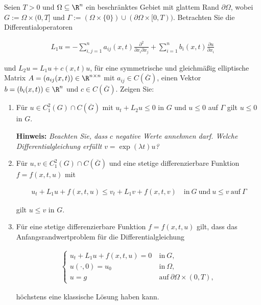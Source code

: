 
\begin{exercise}

\phantom{}

Seien $T > 0$ und $\Omega \subseteq \R^n$ ein beschränktes Gebiet mit glattem Rand $\partial \Omega$, wobei $G := \Omega \times (0, T]$ und $\Gamma := (\Omega \times \{0\}) \cup (\partial \Omega \times [0, T))$.
Betrachten Sie die Differentialoperatoren

\begin{align*}
  L_1 u
  =
  -\sum_{i, j=1}^n
  a_{ij}(x, t)
  \frac{\partial^2}{\partial x_i \partial x_j}
  +
  \sum_{i=1}^n
  b_i(x, t)
  \frac{\partial u}{\partial x_i}
\end{align*}

und $L_2 u = L_1 u + c(x, t) u$, für eine symmetrische und gleichmäßig elliptische Matrix $A = (a_{ij}(x, t)) \in \R^{n \times n}$ mit $a_{ij} \in C(\overline{G})$, einen Vektor $b = (b_i(x, t)) \in \R^n$ und $c \in C(\overline{G})$.
Zeigen Sie:

\begin{enumerate}[label = (\roman*)]

  \item Für $u \in C_1^2(G) \cap C(\overline{G})$ mit $u_t + L_2u \leq 0$ in $G$ und $u \leq 0$ auf $\Gamma$ gilt $u \leq 0$ in $G$.

  \textbf{Hinweis:}
  \textit
  {
    Beachten Sie, dass $c$ negative Werte annehmen darf.
    Welche Differentialgleichung erfüllt $v = \exp(\lambda t) u$?
  }

  \item Für $u, v \in C_1^2(G) \cap C(\overline{G})$ und eine stetige differenzierbare Funktion $f = f(x, t, u)$ mit

  \begin{align*}
    u_t + L_1 u + f(x, t, u)
    \leq
    v_t + L_1 v + f(x, t, v)
    \quad
    \text{in}~ G ~\text{und}~ u \leq v ~\text{auf}~ \Gamma
  \end{align*}

  gilt $u \leq v$ in $G$.

  \item Für eine stetige differenzierbare Funktion $f = f(x, t, u)$ gilt, dass das Anfangsrandwertproblem für die Differentialgleichung

  \begin{align*}
	  \begin{cases}
	  	u_t + L_1 u + f(x, t, u) = 0 & ~\text{in}~ G, \\
	  	u(\cdot, 0) = u_0            & ~\text{in}~ \Omega, \\
	  	u = g                        & ~\text{auf}~ \partial \Omega \times (0, T),
	  \end{cases}
  \end{align*}

  höchstens eine klassische Lösung haben kann.

\end{enumerate}

\end{exercise}

